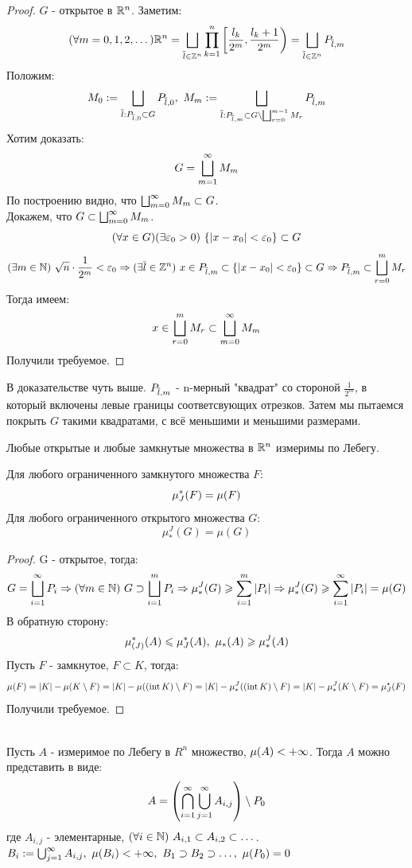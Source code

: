 \begin{proof}
	$G$ - открытое в $\mathbb{R}^n$. Заметим:
	\[(\forall m=0,1,2,\dots)\mathbb{R}^n=\bigsqcup_{\overline l\in\mathbb{Z}^n}\prod_{k=1}^n\left[\frac{l_k}{2^m},\frac{l_k+1}{2^m}\right)=
	\bigsqcup_{\overline l\in\mathbb{Z}^n}P_{\overline l,m}\]
	Положим:
	\[\displaystyle M_0:=\bigsqcup_{\overline l:P_{\overline l,0}\subset G}P_{\overline l,0},\ M_m:=\bigsqcup_{\overline l:P_{\overline l,m}\subset G\setminus\bigsqcup_{r=0}^{m-1}M_r}P_{\overline l,m}\]
	Хотим доказать:
	\[G=\bigsqcup_{m=1}^\infty M_m\]
	По построению видно, что $\bigsqcup_{m=0}^\infty M_m\subset G$.\\
	Докажем, что $G\subset \bigsqcup_{m=0}^\infty M_m$.
	\[(\fa x\in G)(\ex\eps_0>0)\ \{|x-x_0|<\eps_0\}\subset G\]
	\[(\exists m\in\mathbb{N})\ \sqrt n\cdot\frac1{2^m}<\varepsilon_0\Rightarrow(\exists\overline l\in\mathbb{Z}^n)\ x\in P_{\overline l, m}\subset\{|x-x_0|<\varepsilon_0\}\subset G\Rightarrow P_{\overline l,m}\subset\bigsqcup_{r=0}^mM_r\]
	Тогда имеем:
	\[x\in\bigsqcup_{r=0}^mM_r\subset\bigsqcup_{m=0}^\infty M_m\]
	Получили требуемое.
\end{proof}
\begin{anote}
	В доказательстве чуть выше. $P_{\overline l,m}$ - n-мерный "квадрат" со стороной $\frac1{2^m}$, в который включены левые границы соответсвующих отрезков. Затем мы пытаемся покрыть $G$ такими квадратами, с всё меньшими и меньшими размерами.
\end{anote}
\begin{corollary}
	Любые открытые и любые замкнутые множества в $\mathbb{R}^n$ измеримы по Лебегу.
\end{corollary}
\begin{corollary}
	Для любого ограниченного замкнутого множества $F$:
	\[\mu_{J}^*(F)=\mu(F)\]
	Для любого ограниченного открытого множества $G$:
	\[\mu_*^J(G)=\mu(G)\]
\end{corollary}
\begin{proof}
	G - открытое, тогда:
	\[G=\bsc_{i=1}^\i P_i\Ra(\fa m\in\N)\ G\supset\bsc_{i=1}^mP_i\Ra\mu_*^J(G)\ge\sum_{i=1}^m|P_i|\Ra\mu_*^J(G)\ge\sum_{i=1}^\i|P_i|=\mu(G)\]
	В обратную сторону:
	\[\ma(A)\le\mu^*_J(A),\ \mu_*(A)\ge\mu_*^J(A)\]
	Пусть $F$ - замкнутое, $F\subset K$, тогда:
	\[\mu(F)=|K|-\mu(K\setminus F)=|K|-\mu((\operatorname{int} K)\setminus F)=|K|-\mu^J_*((\operatorname{int} K)\setminus F)=|K|-\mu_*^J(K\setminus F)=\mu^*_J(F)\]
	Получили требуемое.
\end{proof}
\begin{theorem}\label{22_th8}\\
	Пусть $A$ - измеримое по Лебегу в $R^n$ множество, $\mu(A)<+\infty$. Тогда $A$ можно представить в виде:
	\[A=\left(\bigcap_{i=1}^\infty\bigcup_{j=1}^\infty A_{i,j}\right)\setminus P_0\]
	где $A_{i,j}$ - элементарные, $(\forall i\in\mathbb{N})\ A_{i,1}\subset A_{i,2}\subset\dots$.\\
	$B_i:=\bc_{j=1}^\i A_{i,j},\ \mu(B_i)<+\i,\ B_1\supset B_2\supset\dots,\ \mu(P_0)=0$
\end{theorem}
